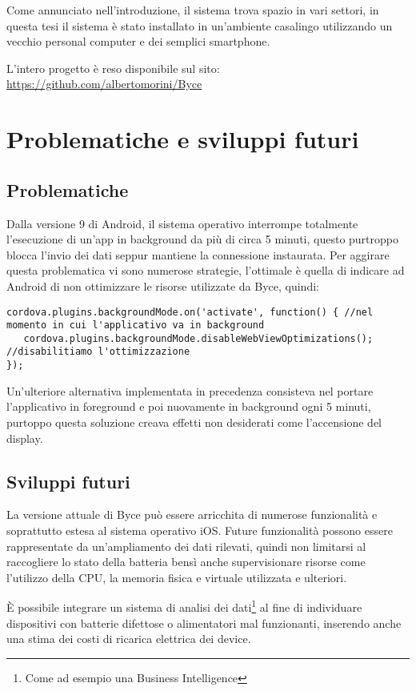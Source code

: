 \documentclass[target=bach]{thud}
\begin{document}
Come annunciato nell'introduzione, il sistema trova spazio in vari settori, in questa tesi il sistema è stato installato in un'ambiente casalingo utilizzando un vecchio personal computer e dei semplici smartphone.

L'intero progetto è reso disponibile sul sito: \url{https://github.com/albertomorini/Byce}

\section{Problematiche e sviluppi futuri}

\subsection{Problematiche}
Dalla versione 9 di Android, il sistema operativo interrompe totalmente l'esecuzione di un'app in background da più di circa 5 minuti, questo purtroppo blocca l'invio dei dati seppur mantiene la connessione instaurata.
Per aggirare questa problematica vi sono numerose strategie, l'ottimale è quella di indicare ad Android di non ottimizzare le risorse utilizzate da Byce, quindi:
\begin{lstlisting}
cordova.plugins.backgroundMode.on('activate', function() { //nel momento in cui l'applicativo va in background
   cordova.plugins.backgroundMode.disableWebViewOptimizations(); //disabilitiamo l'ottimizzazione
});
\end{lstlisting}
Un'ulteriore alternativa implementata in precedenza consisteva nel portare l'applicativo in foreground e poi nuovamente in background ogni 5 minuti, purtoppo questa soluzione creava effetti non desiderati come l'accensione del display.

\subsection{Sviluppi futuri}

La versione attuale di Byce può essere arricchita di numerose funzionalità e soprattutto estesa al sistema operativo iOS.
Future funzionalità possono essere rappresentate da un'ampliamento dei dati rilevati, quindi non limitarsi al raccogliere lo stato della batteria bensì anche supervisionare risorse come l'utilizzo della CPU, la memoria fisica e virtuale utilizzata e ulteriori.

\`E possibile integrare un sistema di analisi dei dati\footnote[1]{Come ad esempio una Business Intelligence} al fine di individuare dispositivi con batterie difettose o alimentatori mal funzionanti, inserendo anche una stima dei costi di ricarica elettrica dei device.
\end{document}
